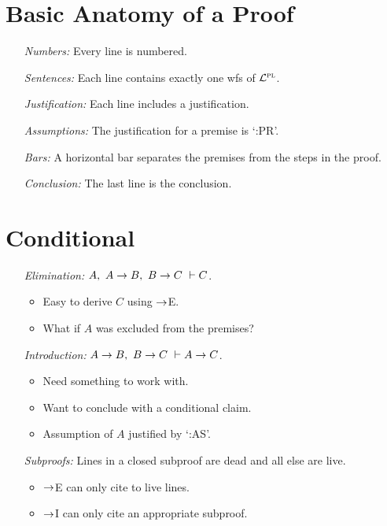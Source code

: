\documentclass[a4paper, 11pt]{article} %
\begin{document}
\section*{Basic Anatomy of a Proof}

\begin{enumerate}
  \item[\it Numbers:] Every line is numbered. 
  \item[\it Sentences:] Each line contains exactly one wfs of $\mathcal{L}^{\textsc{pl}}$. 
  \item[\it Justification:] Each line includes a justification.
  \item[\it Assumptions:] The justification for a premise is `:PR'.
  \item[\it Bars:] A horizontal bar separates the premises from the steps in the proof.
  \item[\it Conclusion:] The last line is the conclusion. 
\end{enumerate}


\section*{Conditional}

\begin{enumerate}
  \item[\it Elimination:] $A,\ A \rightarrow B,\ B \rightarrow C\ \vdash C$. 
    \begin{itemize}
      \item Easy to derive $C$ using $\rightarrow$E.
      \item What if $A$ was excluded from the premises? 
    \end{itemize}
  \item[\it Introduction:] $A \rightarrow B,\ B \rightarrow C\ \vdash A \rightarrow C$. 
    \begin{itemize}
      \item Need something to work with.
      \item Want to conclude with a conditional claim.
      \item Assumption of $A$ justified by `:AS'.
    \end{itemize}
  \item[\it Subproofs:] Lines in a closed subproof are dead and all else are live.
    \begin{itemize}
      \item $\rightarrow$E can only cite to live lines.
      \item $\rightarrow$I can only cite an appropriate subproof.
    \end{itemize}
\end{enumerate}
\end{document}
